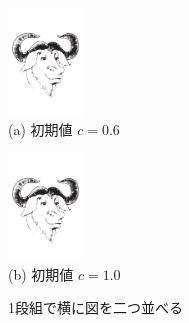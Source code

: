 \begin{figure}[htbp]
  \begin{minipage}{.47\textwidth}
      \centering
      \includegraphics[width=2cm]{images/gnu-head}\\
      {\small(a) 初期値 $c=0.6$}
  \end{minipage}
\hfill
  \begin{minipage}{.47\textwidth}
      \centering
      \includegraphics[width=2cm]{images/gnu-head}\\
      {\small(b) 初期値 $c=1.0$}
  \end{minipage}
  \caption{1段組で横に図を二つ並べる}
\end{figure}


